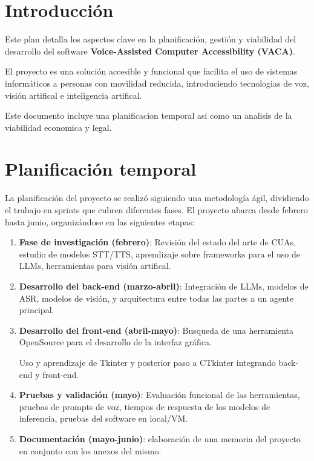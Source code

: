 
\section{Introducción}

Este plan detalla los aspectos clave en la planificación, gestión y viabilidad del desarrollo del software \textbf{Voice-Assisted Computer Accessibility (VACA)}.

El proyecto es una solución accesible y funcional que facilita el uso de sistemas informáticos a personas con movilidad reducida, introduciendo tecnologias de voz, visión artifical e inteligencia artifical.

Este documento incluye una planificacion temporal asi como un analisis de la viabilidad economica y legal.

\section{Planificación temporal}

La planificación del proyecto se realizó siguiendo una metodología ágil, dividiendo el trabajo en sprints que cubren diferentes fases. El proyecto abarca desde febrero hasta junio, organizándose en las siguientes etapas:

\begin{enumerate}
    \item \textbf{Fase de investigación (febrero)}: Revisión del estado del arte de CUAs, estudio de modelos STT/TTS, aprendizaje sobre frameworks para el uso de LLMs, herramientas para visión artifical.
    
    \item \textbf{Desarrollo del back-end (marzo-abril)}:
    Integración de LLMs, modelos de ASR, modelos de visión, y arquitectura entre todas las partes a un agente principal.
    
    \item \textbf{Desarrollo del front-end (abril-mayo)}: 
    Busqueda de una herramienta OpenSource para el desarrollo de la interfaz gráfica.

    Uso y aprendizaje de Tkinter y posterior paso a CTkinter integrando back-end y front-end.
    
    \item \textbf{Pruebas y validación (mayo)}: Evaluación funcional de las herramientas, pruebas de prompts de voz, tiempos de respuesta de los modelos de inferencia, pruebas del software en local/VM.
    
    \item \textbf{Documentación (mayo-junio)}: elaboración de una memoria del proyecto en conjunto con los anexos del mismo.
\end{enumerate}

